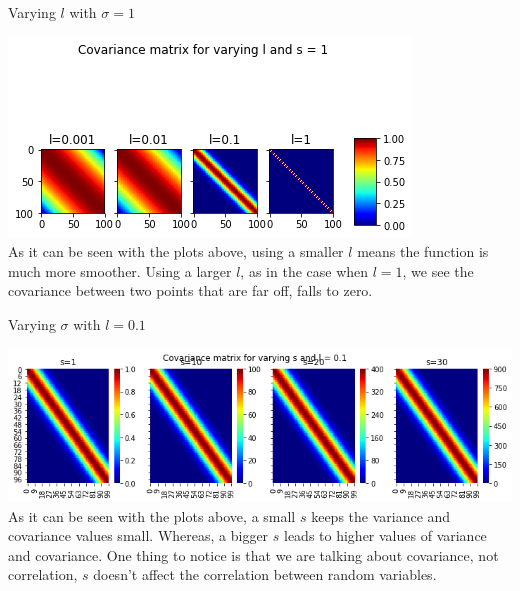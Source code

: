 \documentclass{beamer}
\begin{document}
\begin{frame}{Varying $l$ with $\sigma = 1$}
	\begin{center}
		\includegraphics[width=\linewidth, height=\textheight -120pt ,keepaspectratio]{gp/vary_l}\\
		As it can be seen with the plots above, using a smaller $l$ means the function is much more smoother. Using a larger $l$, as in the case when $l = 1$, we see the covariance between two points that are far off, falls to zero.
	\end{center}
	
\end{frame}

\begin{frame}{Varying $\sigma$ with $l = 0.1$}
	\begin{center}
		\includegraphics[width=\linewidth, height=\textheight -120pt ,keepaspectratio]{gp/vary_s}\\
		As it can be seen with the plots above, a small $s$ keeps the variance and covariance values small. Whereas, a bigger $s$ leads to higher values of variance and covariance. One thing to notice is that we are talking about covariance, not correlation, $s$ doesn't affect the correlation between random variables.
	\end{center}
\end{frame}
\end{document}
